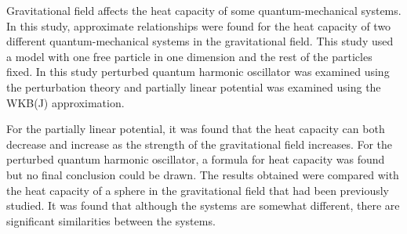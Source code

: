 \documentclass{trkut}%
\begin{document}

Gravitational field affects the heat capacity of some quantum-mechanical systems.
In this study, approximate relationships were found for the heat capacity of two different quantum-mechanical systems in the gravitational field.
This study used a model with one free particle in one dimension and the rest of the particles fixed.
In this study perturbed quantum harmonic oscillator was examined using the perturbation theory and partially linear potential was examined using the WKB(J) approximation.

For the partially linear potential, it was found that the heat capacity can both decrease and increase as the strength of the gravitational field increases.
For the perturbed quantum harmonic oscillator, a formula for heat capacity was found but no final conclusion could be drawn.
The results obtained were compared with the heat capacity of a sphere in the gravitational field that had been previously studied.
It was found that although the systems are somewhat different, there are significant similarities between the systems.

\end{document}
